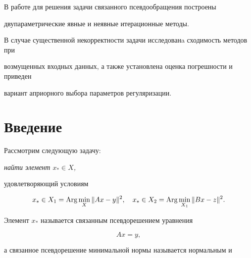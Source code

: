\date{}




\pagestyle{plain} %







\maketitle


\label{begin}








В работе для решения задачи связанного псевдообращения построены 


двупараметрические явные и неявные итерационные методы.


В случае существенной некорректности задачи исследованa сходимость методов при


возмущенных входных данных, а также установлена оценка погрешности и приведен


вариант априорного выбора параметров регуляризации.








\section{Введение}





Рассмотрим следующую задачу: {\it найти элемент $x_*\in X$, 


удовлетворяющий условиям}


\begin{equation}


x_*\in X_1=\Arg\min_X\|{Ax-y}\|^2,\quad x_*\in X_2=\Arg\min_{X_1}\|Bx-z\|^2.


\end{equation}


Элемент $x_*$ называется связанным псевдорешением уравнения


\begin{equation}


Ax=y,


\end{equation}


а связанное псевдорешение минимальной нормы называется нормальным и 


